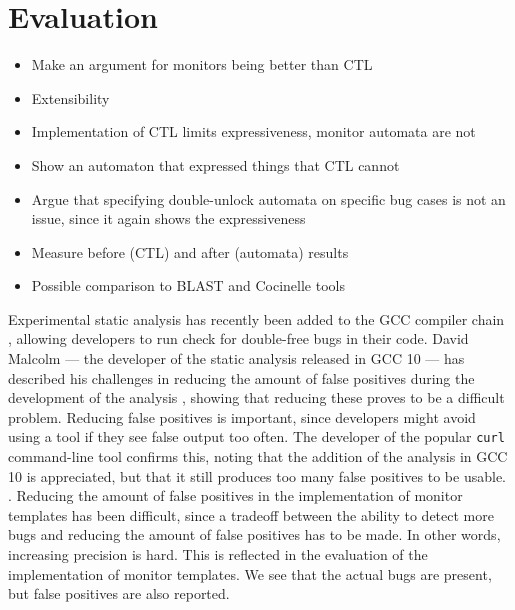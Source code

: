 \section{Evaluation}

\begin{itemize}
    \item Make an argument for monitors being better than CTL 
    \item Extensibility
    
    \setlength\itemindent{15pt} 
    \item Implementation of CTL limits expressiveness, monitor automata are not
    \item Show an automaton that expressed things that CTL cannot
    \item Argue that specifying double-unlock automata on specific bug cases is not an issue, since it again shows the expressiveness 
    \setlength\itemindent{0pt}
    
    \item Measure before (CTL) and after (automata) results
    \item Possible comparison to BLAST and Cocinelle tools
\end{itemize}

\noindent Experimental static analysis has recently been added to the GCC compiler chain \cite{gcc10}, allowing developers to run check for double-free bugs in their code. David Malcolm --- the developer of the static analysis released in GCC 10 --- has described his challenges in reducing the amount of false positives during the development of the analysis \cite{gcc10-development}, showing that reducing these proves to be a difficult problem. Reducing false positives is important, since developers might avoid using a tool if they see false output too often. The developer of the popular \texttt{curl} command-line tool confirms this, noting that the addition of the analysis in GCC 10 is appreciated, but that it still produces too many false positives to be usable. \cite{curl-static-analysis}. Reducing the amount of false positives in the implementation of monitor templates has been difficult, since a tradeoff between the ability to detect more bugs and reducing the amount of false positives has to be made. In other words, increasing precision is hard. This is reflected in the evaluation of the implementation of monitor templates. We see that the actual bugs are present, but false positives are also reported. 